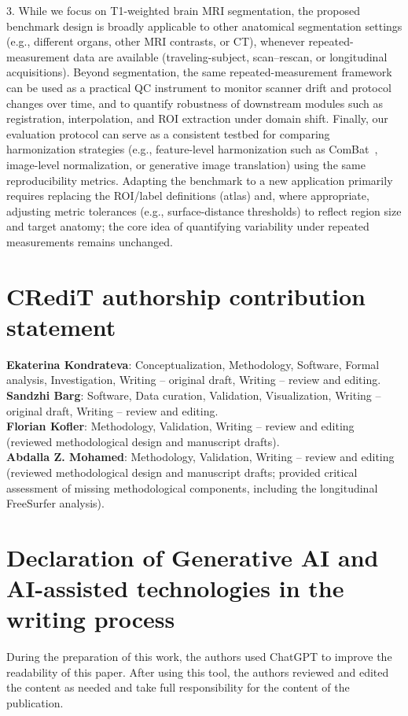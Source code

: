 \documentclass{midl} %
\begin{document}
3. While we focus on T1-weighted brain MRI segmentation, the proposed benchmark design is broadly applicable to other anatomical segmentation settings (e.g., different organs, other MRI contrasts, or CT), whenever repeated-measurement data are available (traveling-subject, scan--rescan, or longitudinal acquisitions).
Beyond segmentation, the same repeated-measurement framework can be used as a practical QC instrument to monitor scanner drift and protocol changes over time, and to quantify robustness of downstream modules such as registration, interpolation, and ROI extraction under domain shift.
Finally, our evaluation protocol can serve as a consistent testbed for comparing harmonization strategies (e.g., feature-level harmonization such as ComBat~\citep{Fortin2018}, image-level normalization, or generative image translation) using the same reproducibility metrics.
Adapting the benchmark to a new application primarily requires replacing the ROI/label definitions (atlas) and, where appropriate, adjusting metric tolerances (e.g., surface-distance thresholds) to reflect region size and target anatomy; the core idea of quantifying variability under repeated measurements remains unchanged.

\section*{CRediT authorship contribution statement}
\noindent
\textbf{Ekaterina Kondrateva}: Conceptualization, Methodology, Software, Formal analysis, Investigation, Writing -- original draft, Writing -- review and editing.\\
\textbf{Sandzhi Barg}: Software, Data curation, Validation, Visualization, Writing -- original draft, Writing -- review and editing.\\
\textbf{Florian Kofler}: Methodology, Validation, Writing -- review and editing (reviewed methodological design and manuscript drafts).\\
\textbf{Abdalla Z. Mohamed}: Methodology, Validation, Writing -- review and editing (reviewed methodological design and manuscript drafts; provided critical assessment of missing methodological components, including the longitudinal FreeSurfer analysis).


\section*{Declaration of Generative AI and AI-assisted technologies in the writing process}
\noindent
During the preparation of this work, the authors used ChatGPT to improve the readability of this paper. After using this tool, the authors reviewed and edited the content as needed and take full responsibility for the content of the publication.
\end{document}
